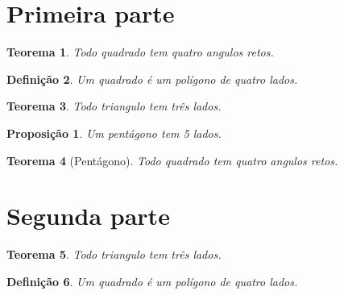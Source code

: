 \documentclass[12pt, a4paper]{article}
\newtheorem{teorema}{Teorema}[section]
\newtheorem{definicao}[teorema]{Definição}
\newtheorem{proposicao}{Proposição}[section]
\begin{document}
	
\section{Primeira parte}

\begin{teorema}
	Todo quadrado tem quatro angulos retos.
\end{teorema}

\begin{definicao}
	Um quadrado é um polígono de quatro lados.
\end{definicao}

\begin{teorema}
	Todo triangulo tem três lados.
\end{teorema}

\begin{proposicao}
	Um pentágono tem 5 lados.
\end{proposicao}

\begin{teorema}[Pentágono]
	Todo quadrado tem quatro angulos retos.
\end{teorema}

\section{Segunda parte}

\begin{teorema}
	Todo triangulo tem três lados.
\end{teorema}

\begin{definicao}
	Um quadrado é um polígono de quatro lados.
\end{definicao}
\end{document}

